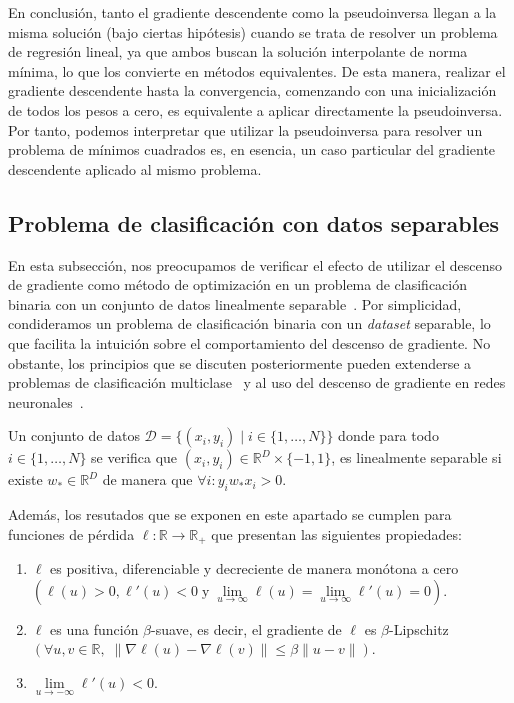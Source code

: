 En conclusión, tanto el gradiente descendente como la pseudoinversa llegan a la misma solución (bajo ciertas hipótesis) cuando se trata de resolver un problema de regresión lineal, ya que ambos buscan la solución interpolante de norma mínima, lo que los convierte en métodos equivalentes. De esta manera, realizar el gradiente descendente hasta la convergencia, comenzando con una inicialización de todos los pesos a cero, es equivalente a aplicar directamente la pseudoinversa. Por tanto, podemos interpretar que utilizar la pseudoinversa para resolver un problema de mínimos cuadrados es, en esencia, un caso particular del gradiente descendente aplicado al mismo problema.

\subsection{Problema de clasificación con datos separables}\label{subsec:problema-clasificación-separable}
En esta subsección, nos preocupamos de verificar el efecto de utilizar el descenso de gradiente como método de optimización en un problema de clasificación binaria con un conjunto de datos linealmente separable~\cite{Soudry2024}. Por simplicidad, condideramos un problema de clasificación binaria con un \textit{dataset} separable, lo que facilita la intuición sobre el comportamiento del descenso de gradiente. No obstante, los principios que se discuten posteriormente pueden extenderse a problemas de clasificación multiclase~\cite{Ravi2024} y al uso del descenso de gradiente en redes neuronales~\cite{Gunasekar2019}.

\begin{definicion}
    Un conjunto de datos $\mathcal{D} = \{ (x_i, y_i) \; | \; i \in \{1, \ldots, N \}\}$ donde para todo $i \in \{1, \ldots, N \}$ se verifica que $(x_i, y_i) \in \mathbb{R}^{D} \times \{-1, 1\}$, es linealmente separable si existe $w_{*} \in \mathbb{R}^{D}$ de manera que $\forall i : y_i w_{*} x_i > 0$.
\end{definicion}

Además, los resutados que se exponen en este apartado se cumplen para funciones de pérdida $\ell: \mathbb{R} \to \mathbb{R}_{+}$ que presentan las siguientes propiedades:
\begin{enumerate}
    \item\label{prop:positiva} $\ell$ es positiva, diferenciable y decreciente de manera monótona a cero $(\ell(u)>0, \ell'(u)<0 \; \text{y} \; \lim \limits_{u \to \infty} \ell(u) = \lim \limits_{u \to \infty} \ell'(u) = 0)$.
    \item\label{prop:smooth} $\ell$ es una función $\beta$-suave, es decir, el gradiente de $\ell$ es $\beta$-Lipschitz $(\forall u,v \in \mathbb{R}, \; \| \nabla \ell(u) - \nabla \ell(v) \| \leq \beta \| u-v \|)$.
    \item\label{prop:derivada_negativa} $\lim \limits_{u \to -\infty} \ell'(u) < 0$.
\end{enumerate}

